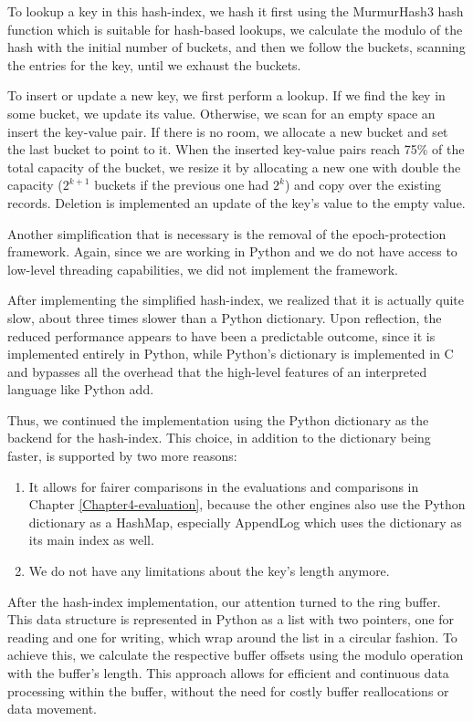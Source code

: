 To lookup a key in this hash-index, we hash it first using the MurmurHash3 hash function which is suitable for hash-based lookups, we calculate the modulo of the hash with the initial number of buckets, and then we follow the buckets, scanning the entries for the key, until we exhaust the buckets.

To insert or update a new key, we first perform a lookup. If we find the key in some bucket, we update its value. Otherwise, we scan for an empty space an insert the key-value pair. If there is no room, we allocate a new bucket and set the last bucket to point to it. When the inserted key-value pairs reach 75\% of the total capacity of the bucket, we resize it by allocating a new one with double the capacity ($2^{k+1}$ buckets if the previous one had $2^{k}$) and copy over the existing records. Deletion is implemented an update of the key's value to the empty value.

Another simplification that is necessary is the removal of the epoch-protection framework. Again, since we are working in Python and we do not have access to low-level threading capabilities, we did not implement the framework.

After implementing the simplified hash-index, we realized that it is actually quite slow, about three times slower than a Python dictionary. Upon reflection, the reduced performance appears to have been a predictable outcome, since it is implemented entirely in Python, while Python's dictionary is implemented in C and bypasses all the overhead that the high-level features of an interpreted language like Python add.

Thus, we continued the implementation using the Python dictionary as the backend for the hash-index. This choice, in addition to the dictionary being faster, is supported by two more reasons:
\begin{enumerate}
    \item It allows for fairer comparisons in the evaluations and comparisons in Chapter \ref{Chapter4-evaluation}, because the other engines also use the Python dictionary as a HashMap, especially AppendLog which uses the dictionary as its main index as well.
    \item We do not have any limitations about the key's length anymore.
\end{enumerate}

After the hash-index implementation, our attention turned to the ring buffer.
This data structure is represented in Python as a list with two pointers, one for reading and one for writing, which wrap around the list in a circular fashion.
To achieve this, we calculate the respective buffer offsets using the modulo operation with the buffer's length.
This approach allows for efficient and continuous data processing within the buffer, without the need for costly buffer reallocations or data movement.

